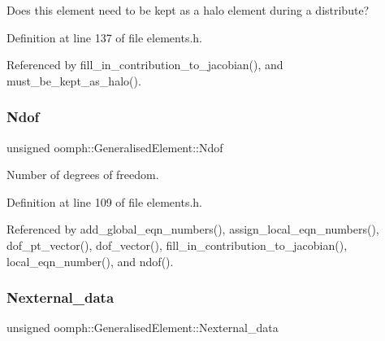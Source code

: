 Does this element need to be kept as a halo element during a distribute? 



Definition at line 137 of file elements.\+h.



Referenced by fill\+\_\+in\+\_\+contribution\+\_\+to\+\_\+jacobian(), and must\+\_\+be\+\_\+kept\+\_\+as\+\_\+halo().

\mbox{\label{classoomph_1_1GeneralisedElement_a954670a779127bc0f1ac514a93b3c0d1}} 
\subsubsection{\texorpdfstring{Ndof}{Ndof}}
{\footnotesize\ttfamily unsigned oomph\+::\+Generalised\+Element\+::\+Ndof\hspace{0.3cm}{\ttfamily [private]}}



Number of degrees of freedom. 



Definition at line 109 of file elements.\+h.



Referenced by add\+\_\+global\+\_\+eqn\+\_\+numbers(), assign\+\_\+local\+\_\+eqn\+\_\+numbers(), dof\+\_\+pt\+\_\+vector(), dof\+\_\+vector(), fill\+\_\+in\+\_\+contribution\+\_\+to\+\_\+jacobian(), local\+\_\+eqn\+\_\+number(), and ndof().

\mbox{\label{classoomph_1_1GeneralisedElement_a7afd137fc0cdb37af809a9204cf74c2b}} 
\subsubsection{\texorpdfstring{Nexternal\+\_\+data}{Nexternal\_data}}
{\footnotesize\ttfamily unsigned oomph\+::\+Generalised\+Element\+::\+Nexternal\+\_\+data\hspace{0.3cm}{\ttfamily [private]}}



